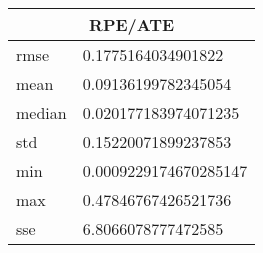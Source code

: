 \begin{table}[!ht] 
 \centering 
 \begin{tabular}{|l|l|} \hline 
 \multicolumn{2}{|c|}{RPE/ATE} \\ \hline 
 rmse & 0.1775164034901822 \\ \hline 
mean & 0.09136199782345054 \\ \hline 
median & 0.020177183974071235 \\ \hline 
std & 0.15220071899237853 \\ \hline 
min & 0.0009229174670285147 \\ \hline 
max & 0.47846767426521736 \\ \hline 
sse & 6.8066078777472585 \\ \hline 
\end{tabular} 
 \end{table}